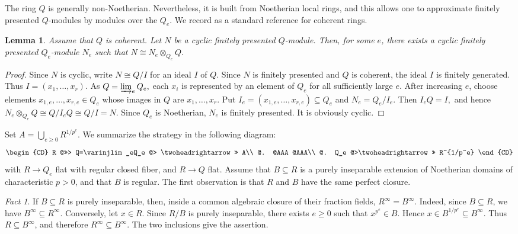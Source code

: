 \documentclass[11pt,a4paper]{amsart}
\numberwithin{equation}{section}
\newtheorem{lemma}[theorem]{Lemma}
\theoremstyle{definition}
\theoremstyle{remark}
\newtheorem{fact}[theorem]{Fact}
\begin{document}
The ring $Q$ is generally non-Noetherian. Nevertheless, it is built
from Noetherian local rings, and this allows one to approximate
finitely presented $Q$-modules by modules over the $Q_e$.
We record \cite{G1} as a standard reference for coherent rings.
\begin{lemma}
	Assume that $Q$ is coherent. Let $N$ be a cyclic finitely presented
	$Q$-module. Then, for some $e$, there exists a cyclic finitely
	presented $Q_e$-module $N_e$ such that
	$
	N\cong N_e\otimes_{Q_e}Q.
	$
\end{lemma}

\begin{proof}
	Since $N$ is cyclic, write
	$
	N\cong Q/I
	$
	for an ideal $I$ of $Q$. Since $N$ is finitely presented and $Q$ is
	coherent, the ideal $I$ is finitely generated. Thus
	$
	I=(x_1,\ldots,x_r).
	$
	As
	$
	Q=\varinjlim_eQ_e,
	$
	each $x_i$ is represented by an element of $Q_e$ for all sufficiently
	large $e$. After increasing $e$, choose elements
	$
	x_{1,e},\ldots,x_{r,e}\in Q_e
	$
	whose images in $Q$ are $x_1,\ldots,x_r$. Put
	$
	I_e=(x_{1,e},\ldots,x_{r,e})\subseteq Q_e
	$
	and
	$
	N_e=Q_e/I_e.
	$
	Then
	$
	I_eQ=I,
	$
	and hence
	$
	N_e\otimes_{Q_e}Q
	\cong Q/I_eQ
	\cong Q/I
	=N.
	$
	Since $Q_e$ is Noetherian, $N_e$ is finitely presented. It is
	obviously cyclic.
\end{proof}

Set
\(
A=\bigcup_{e\geq 0}R^{1/p^e}.
\) We summarize the strategy in the following diagram:
\[
\begin{CD}
R @>>> Q=\varinjlim_eQ_e @> 
\twoheadrightarrow	>> A\\
@. @AAA @AAA\\
@. Q_e @>\twoheadrightarrow>> R^{1/p^e}
\end{CD}
\]
with
$
R\to Q_e$ {flat with regular closed fiber},
and
$
R\to Q
$  flat.
Assume that $B\subseteq R$ is a purely inseparable extension of
Noetherian domains of characteristic $p>0$, and that $B$ is regular.
The first observation is that $R$ and $B$ have the same perfect
closure.

\begin{fact}
	If $B\subseteq R$ is purely inseparable, then, inside a common
	algebraic closure of their fraction fields,
	$
	R^\infty=B^\infty.
	$ Indeed, since $B\subseteq R$, we have
	$
	B^\infty\subseteq R^\infty.
	$
	Conversely, let $x\in R$. Since $R/B$ is purely inseparable, there
	exists $e\geq 0$ such that
	$
	x^{p^e}\in B.
	$
	Hence
	$
	x\in B^{1/p^e}\subseteq B^\infty.
	$
	Thus $R\subseteq B^\infty$, and therefore
	$
	R^\infty\subseteq B^\infty.
	$
	The two inclusions give the assertion.
\end{fact}
\end{document}
